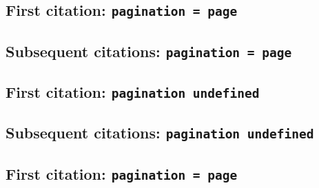 \documentclass[a4paper]{article}
\begin{document}
\cite{olson:2003}

\cite[577]{olson:2003}

\cite[note]{olson:2003}

\subsection{First citation: \texttt{pagination = page}}

\cite{olson:2003:a}

\citereset
\cite[577]{olson:2003:a}

\citereset
\cite[note]{olson:2003:a}

\subsection{Subsequent citations: \texttt{pagination = page}}

\cite{olson:2003:a}

\cite[577]{olson:2003:a}

\cite[note]{olson:2003:a}

\subsection{First citation: \texttt{pagination undefined}}

\cite{stendahl:1962}

\citereset
\cite[577]{stendahl:1962}

\citereset
\cite[note]{stendahl:1962}

\subsection{Subsequent citations: \texttt{pagination undefined}}

\cite{stendahl:1962}

\cite[577]{stendahl:1962}

\AtNextCite{\renewcommand*{\volcitedelim}{\addcomma\space}}
\cite[note]{stendahl:1962}

\subsection{First citation: \texttt{pagination = page}}

\cite{stendahl:1962:a}

\citereset
\cite[577]{stendahl:1962:a}

\citereset
\cite[note]{stendahl:1962:a}
\end{document}
